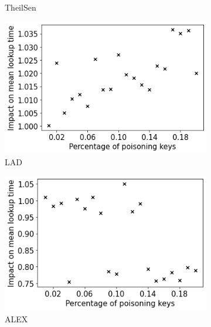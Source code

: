 \documentclass[sigconf]{acmart}
\begin{document}
\begin{figure}[h]
\begin{subfigure}[b]{0.24\textwidth}
        \caption{TheilSen}
    \end{subfigure}
    \hfill
    \begin{subfigure}[b]{0.24\textwidth}
        \centering
        \includegraphics[width=\textwidth]{figures/learned_indexes-mean_lookup_time-deterioration_lad.png}
        \caption{LAD}
    \end{subfigure}
    \hfill
    \begin{subfigure}[b]{0.24\textwidth}
        \centering
        \includegraphics[width=\textwidth]{figures/learned_indexes-mean_lookup_time-deterioration_alex.png}
        \caption{ALEX}
    \end{subfigure}
    \hfill
    \begin{subfigure}[b]{0.24\textwidth}
        \centering

\end{subfigure}
\end{figure}
\end{document}
